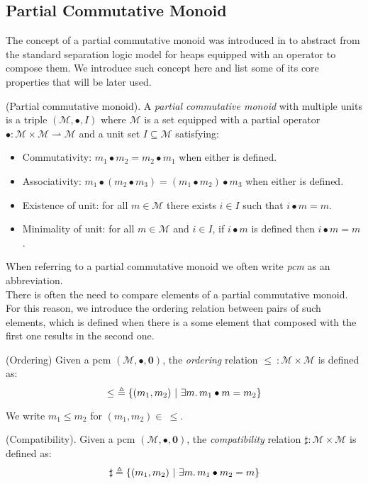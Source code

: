 \subsection{Partial Commutative Monoid}

The concept of a partial commutative monoid was introduced in \cite{sepalgebra} to abstract from the standard separation logic model for heaps equipped with an operator to compose them. We introduce such concept here and list some of its core properties that will be later used.

\begin{defn}
	(Partial commutative monoid).
	A \emph{partial commutative monoid} with multiple units \cite{views} is a triple $(\mathcal{M}, \bullet, I)$ where $\mathcal{M}$ is a set equipped with a partial operator $\bullet : \mathcal{M} \times \mathcal{M} \rightharpoonup \mathcal{M}$ and a unit set $I \subseteq \mathcal{M}$ satisfying:
	\begin{itemize}
		\item Commutativity: $m_1 \bullet m_2 = m_2 \bullet m_1$ when either is defined.
		\item Associativity: $m_1 \bullet (m_2 \bullet m_3) = (m_1 \bullet m_2) \bullet m_3$ when either is defined.
		\item Existence of unit: for all $m \in \mathcal{M}$ there exists $i \in I$ such that $i \bullet m = m$.
		\item Minimality of unit: for all $m \in \mathcal{M}$ and $i \in I$, if $i \bullet m$ is defined then $i \bullet m = m$.
	\end{itemize}
\end{defn}
When referring to a partial commutative monoid we often write \emph{pcm} as an abbreviation. \\

There is often the need to compare elements of a partial commutative monoid. For this reason, we introduce the ordering relation between pairs of such elements, which is defined when there is a some element that composed with the first one results in the second one.
\begin{defn}
	(Ordering)
	Given a pcm $(\mathcal{M}, \bullet, \mathbf{0})$, the \emph{ordering} relation $\leq\ : \mathcal{M} \times \mathcal{M}$ is defined as:
\[
	\leq\ \triangleq \{ (m_1, m_2)\ |\ \exists m \ldotp m_1 \bullet m = m_2 \}
\]
\end{defn}
We write $m_1 \leq m_2$ for $(m_1, m_2) \in\ \leq$.

\begin{defn}
	(Compatibility).
	Given a pcm $(\mathcal{M}, \bullet, \mathbf{0})$, the \emph{compatibility} relation $\sharp : \mathcal{M} \times \mathcal{M}$ is defined as:
\[
	\sharp \triangleq \{ (m_1, m_2)\ |\ \exists m \ldotp m_1 \bullet m_2 = m \}
\]
\end{defn}

